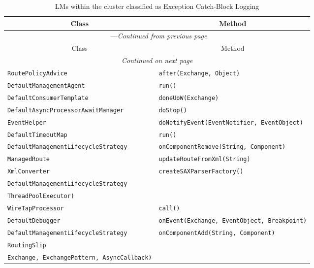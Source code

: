 \begin{center}
\begin{longtable}{ll}
\caption{LMs within the cluster classified as Exception Catch-Block Logging}\\
\toprule\multicolumn{1}{c}{Class}&\multicolumn{1}{c}{Method}\\\midrule
\endfirsthead

\multicolumn{2}{c}{\tablename\ \thetable{}---\textit{Continued from previous page}} \\\midrule
\multicolumn{1}{c}{Class}&\multicolumn{1}{c}{Method}\\\midrule
\endhead
\multicolumn{2}{c}{\textit{Continued on next page}}\\\midrule
\endfoot
\bottomrule
\endlastfoot

\lstinline/RoutePolicyAdvice/&{\lstinline/after(Exchange, Object)/}\\
\lstinline/DefaultManagementAgent/&{\lstinline/run()/}\\
\lstinline/DefaultConsumerTemplate/&{\lstinline/doneUoW(Exchange)/}\\
\lstinline/DefaultAsyncProcessorAwaitManager/&{\lstinline/doStop()/}\\
\lstinline/EventHelper/&{\lstinline/doNotifyEvent(EventNotifier, EventObject)/}\\
\lstinline/DefaultTimeoutMap/&{\lstinline/run()/}\\
\lstinline/DefaultManagementLifecycleStrategy/&{\lstinline/onComponentRemove(String, Component)/}\\
\lstinline/ManagedRoute/&{\lstinline/updateRouteFromXml(String)/}\\
\lstinline/XmlConverter/&{\lstinline/createSAXParserFactory()/}\\
\lstinline/DefaultManagementLifecycleStrategy/&\raisebox{-13pt}{\shortstack{\lstinline/onThreadPoolRemove(CamelContext,/\\\lstinline/ThreadPoolExecutor)/}}\\
\lstinline/WireTapProcessor/&{\lstinline/call()/}\\
\lstinline/DefaultDebugger/&{\lstinline/onEvent(Exchange, EventObject, Breakpoint)/}\\
\lstinline/DefaultManagementLifecycleStrategy/&{\lstinline/onComponentAdd(String, Component)/}\\
\lstinline/RoutingSlip/&\raisebox{-13pt}{\shortstack{\lstinline/doInAsyncProducer(Producer, AsyncProcessor,/\\\lstinline/Exchange, ExchangePattern, AsyncCallback)/}}\\

\end{longtable}
\end{center}
